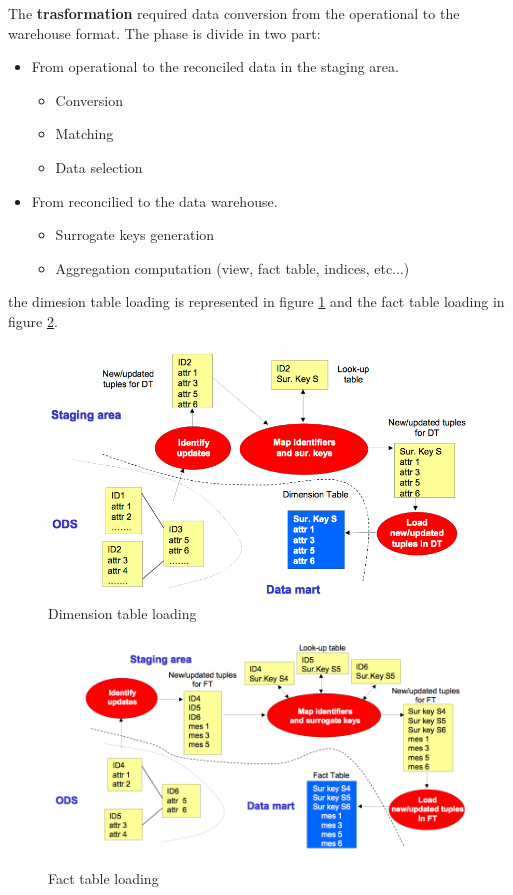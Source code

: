 \documentclass[12pt]{article}
\begin{document}
The \textbf{trasformation} required data conversion from the operational to the warehouse format. The phase is divide in two part:
\begin{itemize}
  \item From operational to the reconciled data in the staging area.
  \begin{itemize}
    \item Conversion
    \item Matching
    \item Data selection
  \end{itemize}
  \item From reconcilied to the data warehouse.
  \begin{itemize}
    \item Surrogate keys generation
    \item Aggregation computation (view, fact table, indices, etc...)
  \end{itemize}
\end{itemize}
the dimesion table loading is represented in figure \ref{fig:dimload} and the fact table loading in figure \ref{fig:factload}.

\begin{figure}[h!]
  \includegraphics[width=\linewidth]{images/dimload.png}
  \caption{Dimension table loading}
  \label{fig:dimload}
\end{figure}
\begin{figure}[h!]
  \includegraphics[width=\linewidth]{images/factload.png}
  \caption{Fact table loading}
  \label{fig:factload}
\end{figure}
\end{document}
